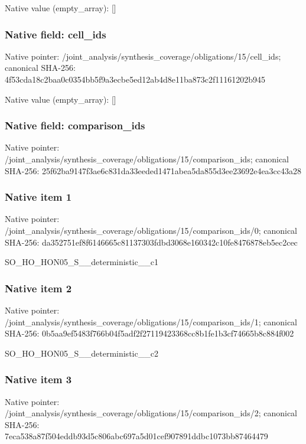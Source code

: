 \documentclass[10pt,a4paper]{article}
\begin{document}
Native value (empty\_\allowbreak{}array): []

\subsubsection{Native field: cell\_\allowbreak{}ids}
Native pointer: /joint\_\allowbreak{}analysis/synthesis\_\allowbreak{}coverage/obligations/15/cell\_\allowbreak{}ids; canonical SHA-256: 4f53cda18c2baa0c0354bb5f9a3ecbe5ed12ab4d8e11ba873c2f11161202b945

Native value (empty\_\allowbreak{}array): []

\subsubsection{Native field: comparison\_\allowbreak{}ids}
Native pointer: /joint\_\allowbreak{}analysis/synthesis\_\allowbreak{}coverage/obligations/15/comparison\_\allowbreak{}ids; canonical SHA-256: 25f62ba9147f3ae6c831da33eeded1471abea5da855d3ee23692e4ea3cc43a28

\subsubsection{Native item 1}
Native pointer: /joint\_\allowbreak{}analysis/synthesis\_\allowbreak{}coverage/obligations/15/comparison\_\allowbreak{}ids/0; canonical SHA-256: da352751ef8f6146665c81137303fdbd3068e160342c10fe8476878eb5ec2cec

\begingroup\raggedright\sloppy SO\_\allowbreak{}HO\_\allowbreak{}HON05\_\allowbreak{}S\_\allowbreak{}\_\allowbreak{}deterministic\_\allowbreak{}\_\allowbreak{}c1\par\endgroup

\subsubsection{Native item 2}
Native pointer: /joint\_\allowbreak{}analysis/synthesis\_\allowbreak{}coverage/obligations/15/comparison\_\allowbreak{}ids/1; canonical SHA-256: 0b5aa9ef5483f766b04f5adf2f27119423368cc8b1fe1b3cf74665b8c884f002

\begingroup\raggedright\sloppy SO\_\allowbreak{}HO\_\allowbreak{}HON05\_\allowbreak{}S\_\allowbreak{}\_\allowbreak{}deterministic\_\allowbreak{}\_\allowbreak{}c2\par\endgroup

\subsubsection{Native item 3}
Native pointer: /joint\_\allowbreak{}analysis/synthesis\_\allowbreak{}coverage/obligations/15/comparison\_\allowbreak{}ids/2; canonical SHA-256: 7eca538a87f504eddb93d5c806abc697a5d01cef907891ddbc1073bb87464479
\end{document}
